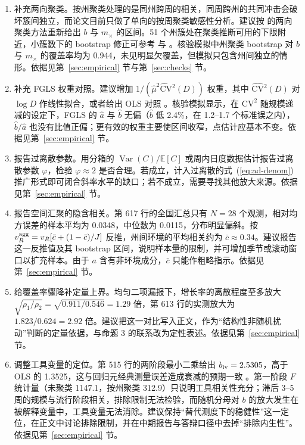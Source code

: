 \begin{enumerate}
\item 补充两向聚类。按州聚类处理的是同州跨周的相关，同周跨州的共同冲击会破坏簇间独立，而论文目前只做了单向的按周聚类敏感性分析。建议按 \citet{cameron2011robust} 的两向聚类方法重新给出 $b$ 与 $m_\times$ 的区间。51 个州簇处在聚类推断可用的下限附近，小簇数下的 bootstrap 修正可参考 \citet{cameron2008bootstrap} 与 \citet{cameron2015practitioner}。核验模拟中州聚类 bootstrap 对 $b$ 与 $m_\times$ 的覆盖率均为 0.944，未见明显欠覆盖，但模拟只包含州间独立的情形。依据见第~\ref{sec:empirical} 节与第~\ref{sec:checks} 节。

\item 补充 FGLS 权重对照。建议增加 $1/(\hat\mu^2\widehat{\mathrm{CV}}{}^2(D))$ 权重，其中 $\widehat{\mathrm{CV}}{}^2(D)$ 对 $\log D$ 作线性拟合，或者给出 OLS 对照 \citep{wooldridge2010econometric}。核验模拟显示，在 $\mathrm{CV}^2$ 随规模递减的设定下，FGLS 的 $\hat a$ 与 $\hat b$ 无偏（$\hat b$ 低 2.4\%，在 1.2--1.7 个标准误之内），$\hat b/\hat a$ 也没有比值正偏；更有效的权重主要使区间收窄，点估计应基本不变。依据见第~\ref{sec:empirical} 节。

\item 报告过离散参数。用分箱的 $\operatorname{Var}(C)/\mathbb{E}[C]$ 或周内日度数据估计报告过离散参数 $\varphi$，检验 $\varphi\approx2$ 是否合理。若成立，计入过离散的式~(\ref{eq:ad-denom}) 推广形式即可闭合斜率水平的缺口；若不成立，需要寻找其他放大来源。依据见第~\ref{sec:empirical} 节。

\item 报告空间汇聚的隐含相关。第 617 行的全国汇总只有 $N=28$ 个观测，相对均方误差的样本平均为 0.0348，中位数为 0.0115，分布明显偏斜。按 $v_R^{\rm agg}=v_R[\bar c+(1-\bar c)/J]$ 反推，州间环境的平均相关约为 $\bar c\approx0.34$。建议报告这一反推值及其 bootstrap 区间，说明样本量的限制，并可增加季节或滚动窗口以扩充样本。由于 $a$ 含有非环境成分，$\bar c$ 只能作粗略指示。依据见第~\ref{sec:empirical} 节。

\item 给覆盖率骤降补定量上界。均匀二项漏报下，增长率的离散程度至多放大 $\sqrt{\rho_1/\rho_2}=\sqrt{0.911/0.546}=1.29$ 倍，第 613 行的实测放大为 $1.823/0.624=2.92$ 倍。建议把这一对比写入正文，作为“结构性非随机扰动”判断的定量依据，与命题 3 的联系改为定性表述。依据见第~\ref{sec:empirical} 节。

\item 调整工具变量的定位。第 515 行的两阶段最小二乘给出 $b_{\rm iv}=2.5305$，高于 OLS 的 1.3525，这与回归元经典测量误差造成衰减的预期一致 \citep{fuller1987measurement,carroll2006measurement}。第一阶段 $F$ 统计量（未聚类 1147.1，按州聚类 312.9）只说明工具相关性充分；滞后 3--5 周的规模与流行阶段相关，排除限制无法检验，而随机分母对 $b$ 的放大发生在被解释变量中，工具变量无法消除。建议保持“替代测度下的稳健性”这一定位，在正文中讨论排除限制，并在中期报告与答辩口径中去掉“排除内生性”。依据见第~\ref{sec:empirical} 节。
\end{enumerate}

